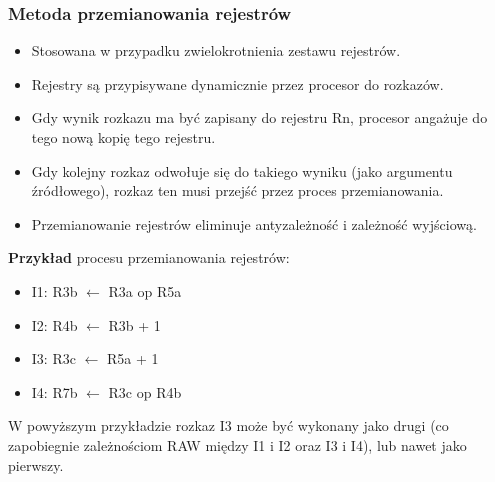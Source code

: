 		\subsubsection{Metoda przemianowania rejestrów}
			\begin{itemize}
				\item Stosowana w przypadku zwielokrotnienia zestawu rejestrów.
				\item Rejestry są przypisywane dynamicznie przez procesor do rozkazów.
				\item Gdy wynik rozkazu ma być zapisany do rejestru Rn, procesor angażuje do tego nową kopię tego rejestru.
				\item Gdy kolejny rozkaz odwołuje się do takiego wyniku (jako argumentu źródłowego), rozkaz ten musi przejść przez proces przemianowania.
				\item Przemianowanie rejestrów eliminuje antyzależność i zależność wyjściową.
			\end{itemize}
			\textbf{Przykład} procesu przemianowania rejestrów:
			\begin{itemize}
				\item I1: R3b $ \leftarrow $ R3a op R5a
				\item I2: R4b $ \leftarrow $ R3b + 1
				\item I3: R3c $ \leftarrow $ R5a + 1
				\item I4: R7b $ \leftarrow $ R3c op R4b
			\end{itemize}
			W powyższym przykładzie rozkaz I3 może być wykonany jako drugi (co zapobiegnie zależnościom RAW między I1 i I2 oraz I3 i I4), lub nawet jako pierwszy.
			\vfill
			
